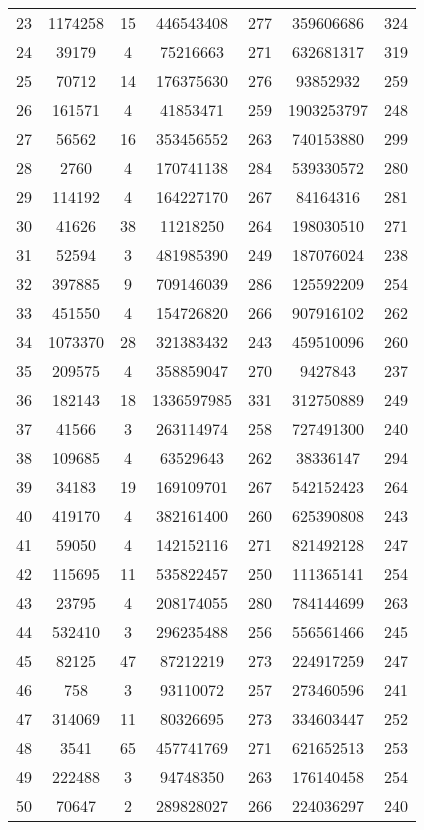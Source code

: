 \documentclass[tikz, 12pt]{scrartcl}
\begin{document}
\begin{longtable}{|c|cc|cc|cc|}
23	 &1174258	 & 	15	 &446543408	 & 	277	 &359606686	 & 	324\\
24	 &39179	 & 	4	 &75216663	 & 	271	 &632681317	 & 	319\\
25	 &70712	 & 	14	 &176375630	 & 	276	 &93852932	 & 	259\\
26	 &161571	 & 	4	 &41853471	 & 	259	 &1903253797	 & 	248\\
27	 &56562	 & 	16	 &353456552	 & 	263	 &740153880	 & 	299\\
28	 &2760	 & 	4	 &170741138	 & 	284	 &539330572	 & 	280\\
29	 &114192	 & 	4	 &164227170	 & 	267	 &84164316	 & 	281\\
30	 &41626	 & 	38	 &11218250	 & 	264	 &198030510	 & 	271\\
31	 &52594	 & 	3	 &481985390	 & 	249	 &187076024	 & 	238\\
32	 &397885	 & 	9	 &709146039	 & 	286	 &125592209	 & 	254\\
33	 &451550	 & 	4	 &154726820	 & 	266	 &907916102	 & 	262\\
34	 &1073370	 & 	28	 &321383432	 & 	243	 &459510096	 & 	260\\
35	 &209575	 & 	4	 &358859047	 & 	270	 &9427843	 & 	237\\
36	 &182143	 & 	18	 &1336597985	 & 	331	 &312750889	 & 	249\\
37	 &41566	 & 	3	 &263114974	 & 	258	 &727491300	 & 	240\\
38	 &109685	 & 	4	 &63529643	 & 	262	 &38336147	 & 	294\\
39	 &34183	 & 	19	 &169109701	 & 	267	 &542152423	 & 	264\\
40	 &419170	 & 	4	 &382161400	 & 	260	 &625390808	 & 	243\\
41	 &59050	 & 	4	 &142152116	 & 	271	 &821492128	 & 	247\\
42	 &115695	 & 	11	 &535822457	 & 	250	 &111365141	 & 	254\\
43	 &23795	 & 	4	 &208174055	 & 	280	 &784144699	 & 	263\\
44	 &532410	 & 	3	 &296235488	 & 	256	 &556561466	 & 	245\\
45	 &82125	 & 	47	 &87212219	 & 	273	 &224917259	 & 	247\\
46	 &758	 & 	3	 &93110072	 & 	257	 &273460596	 & 	241\\
47	 &314069	 & 	11	 &80326695	 & 	273	 &334603447	 & 	252\\
48	 &3541	 & 	65	 &457741769	 & 	271	 &621652513	 & 	253\\
49	 &222488	 & 	3	 &94748350	 & 	263	 &176140458	 & 	254\\
50	 &70647	 & 	2	 &289828027	 & 	266	 &224036297	 & 	240\\
\hline
\end{longtable}
\end{document}
